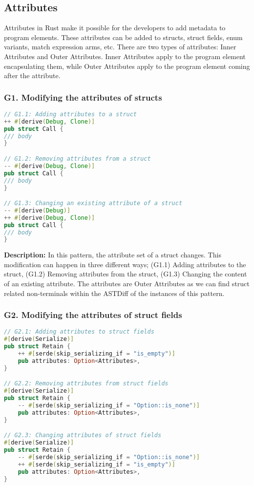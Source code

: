 \subsection{Attributes}

Attributes in Rust make it possible for the developers to add metadata to program elements. These attributes can be added to structs, struct fields, enum variants, match expression arms, etc. There are two types of attributes: Inner Attributes and Outer Attributes. Inner Attributes apply to the program element encapsulating them, while Outer Attributes apply to the program element coming after the attribute.

\subsubsection{G1. Modifying the attributes of structs}

\begin{lstlisting}[language=Rust, style=colouredRust, label={l3}]
// G1.1: Adding attributes to a struct
++ #[derive(Debug, Clone)]
pub struct Call {
/// body 
}

// G1.2: Removing attributes from a struct
-- #[derive(Debug, Clone)]
pub struct Call {
/// body 
}

// G1.3: Changing an existing attribute of a struct
-- #[derive(Debug)]
++ #[derive(Debug, Clone)]
pub struct Call {
/// body 
}
\end{lstlisting}

\noindent \textbf{Description:} In this pattern, the attribute set of a struct changes. This modification can happen in three different ways; (G1.1) Adding attributes to the struct, (G1.2) Removing attributes from the struct, (G1.3) Changing the content of an existing attribute. The attributes are Outer Attributes as we can find struct related non-terminals within the ASTDiff of the instances of this pattern.

\subsubsection{G2. Modifying the attributes of struct fields}

\begin{lstlisting}[language=Rust, style=colouredRust, label={l3}]
// G2.1: Adding attributes to struct fields
#[derive(Serialize)]
pub struct Retain {
    ++ #[serde(skip_serializing_if = "is_empty")]
    pub attributes: Option<Attributes>,
}

// G2.2: Removing attributes from struct fields
#[derive(Serialize)]
pub struct Retain {
    -- #[serde(skip_serializing_if = "Option::is_none")]
    pub attributes: Option<Attributes>,
}

// G2.3: Changing attributes of struct fields
#[derive(Serialize)]
pub struct Retain {
    -- #[serde(skip_serializing_if = "Option::is_none")]
    ++ #[serde(skip_serializing_if = "is_empty")]
    pub attributes: Option<Attributes>,
}
\end{lstlisting}

